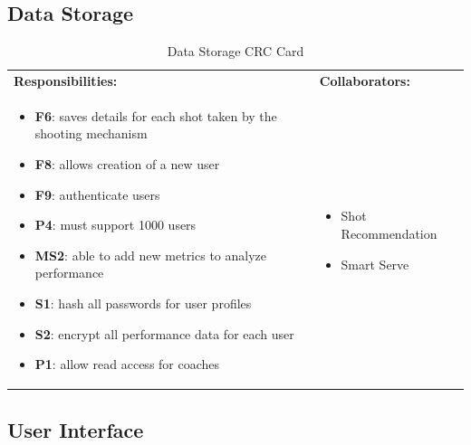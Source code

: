 \documentclass[11pt]{article}
\begin{document}
\subsection{Data Storage}

\begin{table}[H]
\centering
\label{my-label}
\begin{tabular}{ | >{\raggedright\arraybackslash}p{} | >{\raggedright\arraybackslash}p{} | }
\hline
\multicolumn{2}{|c|}{\textbf{Smart Serve}}             \\ \hline
\textbf{Responsibilities:} & \textbf{Collaborators:} \\ \hline
\begin{itemize}
\item \textbf{F6}: saves details for each shot taken by the shooting mechanism
\item \textbf{F8}: allows creation of a new user
\item \textbf{F9}: authenticate users
\item \textbf{P4}: must support 1000 users
\item \textbf{MS2}: able to add new metrics to analyze performance
\item \textbf{S1}: hash all passwords for user profiles
\item \textbf{S2}: encrypt all performance data for each user
\item \textbf{P1}: allow read access for coaches
\end{itemize}
&
\begin{itemize}
\item Shot Recommendation
\item Smart Serve
\end{itemize} \\ \hline
\end{tabular}
\caption{Data Storage CRC Card}
\end{table}

\subsection{User Interface}
\end{document}
